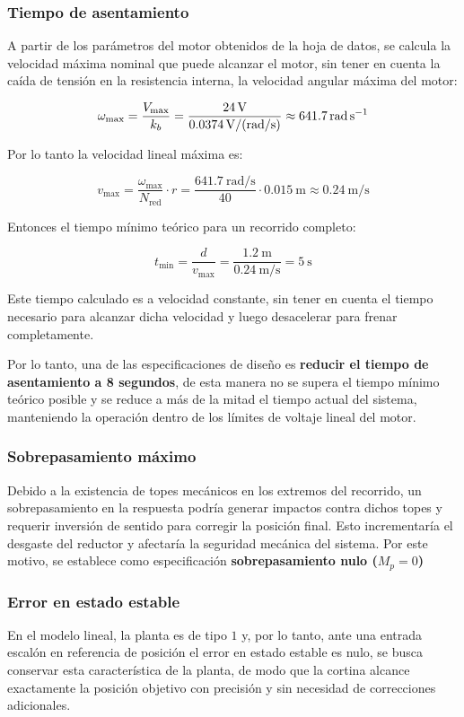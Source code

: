 \subsubsection{Tiempo de asentamiento}
A partir de los parámetros del motor obtenidos de la hoja de datos, se calcula la velocidad máxima nominal que puede alcanzar el motor, sin tener en cuenta la caída de tensión en la resistencia interna, la velocidad angular máxima del motor:

\begin{equation}
	\omega_{\text{max}} = \frac{V_{\text{max}}}{k_b} = \frac{\SI{24}{\volt}}{\SI{0,0374}{\volt\per(\radian{\per\second})}} \approx \SI{641,7}{\radian\per\second} \label{eq:va_max}
\end{equation}


Por lo tanto la velocidad lineal máxima es:

\[
v_{\text{max}} = \frac{\omega_{\text{max}}}{N_{\text{red}}}\cdot r = \frac{\SI{641,7}{\radian\per\second}}{40}\cdot \SI{0,015}{\meter} \approx \SI{0,24}{\meter\per\second} 
\]

Entonces el tiempo mínimo teórico para un recorrido completo:

\begin{equation}
	t_{\text{min}} = \frac{d}{v_{\text{max}}} = \frac{\SI{1,2}{\meter}}{\SI{0,24}{\meter\per\second}} = \SI{5}{\second} \label{eq:tmin}
\end{equation}

Este tiempo calculado es a velocidad constante, sin tener en cuenta el tiempo necesario para alcanzar dicha velocidad y luego desacelerar para frenar completamente.

Por lo tanto, una de las especificaciones de diseño es \textbf{reducir el tiempo de asentamiento a 8 segundos}, de esta manera no se supera el tiempo mínimo teórico posible y se reduce a más de la mitad el tiempo actual del sistema, manteniendo la operación dentro de los límites de voltaje lineal del motor.

\subsubsection{Sobrepasamiento máximo}

Debido a la existencia de topes mecánicos en los extremos del recorrido, un sobrepasamiento en la respuesta podría generar impactos contra dichos topes y requerir inversión de sentido para corregir la posición final. Esto incrementaría el desgaste del reductor y afectaría la seguridad mecánica del sistema. Por este motivo, se establece como especificación \textbf{sobrepasamiento nulo ($M_p = 0$)}

\subsubsection{Error en estado estable}

En el modelo lineal, la planta es de tipo $1$ y, por lo tanto, ante una entrada escalón en referencia de posición el error en estado estable es nulo, se busca conservar esta característica de la planta, de modo que la cortina alcance exactamente la posición objetivo con precisión y sin necesidad de correcciones adicionales.